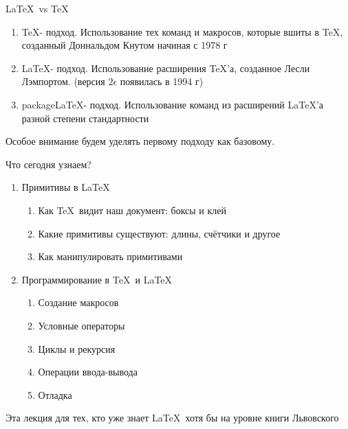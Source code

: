 \begin{frame}{\LaTeX\ vs \TeX}\relax
    \begin{enumerate}
        \item {\ccsc\TeX - подход}. Использование тех команд и макросов, которые вшиты в \TeX, созданный Доннальдом Кнутом начиная с 1978 г
        \item {\ccsc\LaTeX - подход}. Использование расширения \TeX 'а, созданное Лесли Лэмпортом. (версия $2\epsilon$ появилась в 1994 г)
        \item {\ccsc package\LaTeX - подход}. Использование команд из расширений \LaTeX'а разной степени стандартности
    \end{enumerate}
     
     Особое внимание будем уделять первому подходу как базовому.
     
\end{frame}

\begin{frame}{Что сегодня узнаем?}\relax
    \begin{enumerate}
        \item Примитивы в \LaTeX
        \begin{enumerate}
            \item Как \TeX\ видит наш документ: боксы и клей
            \item Какие примитивы существуют: длины, счётчики и другое
            \item Как манипулировать примитивами
        \end{enumerate}
        
        \item Программирование в \TeX\ и \LaTeX
        \begin{enumerate}
            \item Создание макросов
            \item Условные операторы
            \item Циклы и рекурсия
            \item Операции ввода-вывода
            \item Отладка
        \end{enumerate}
         
    \end{enumerate}
    \inpause Эта лекция для тех, кто уже знает \LaTeX\ хотя бы на уровне книги Львовского
\end{frame}


